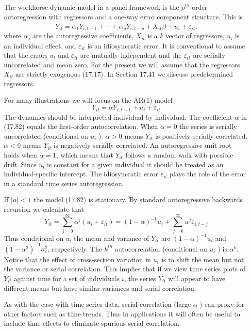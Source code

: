 \documentclass[10pt]{article}
\begin{document}
The workhorse dynamic model in a panel framework is the $p^{t h}$-order autoregression with regressors and a one-way error component structure. This is
$$
Y_{i t}=\alpha_{1} Y_{i, t-1}+\cdots+\alpha_{p} Y_{i, t-p}+X_{i t}^{\prime} \beta+u_{i}+\varepsilon_{i t} .
$$
where $\alpha_{j}$ are the autoregressive coefficients, $X_{i t}$ is a $k$ vector of regressors, $u_{i}$ is an individual effect, and $\varepsilon_{i t}$ is an idiosyncratic error. It is conventional to assume that the errors $u_{i}$ and $\varepsilon_{i t}$ are mutually independent and the $\varepsilon_{i t}$ are serially uncorrelated and mean zero. For the present we will assume that the regressors $X_{i t}$ are strictly exogenous (17.17). In Section $17.41$ we discuss predetermined regressors.

For many illustrations we will focus on the AR(1) model
$$
Y_{i t}=\alpha Y_{i, t-1}+u_{i}+\varepsilon_{i t}
$$
The dynamics should be interpreted individual-by-individual. The coefficient $\alpha$ in (17.82) equals the first-order autocorrelation. When $\alpha=0$ the series is serially uncorrelated (conditional on $u_{i}$ ). $\alpha>0$ means $Y_{i t}$ is positively serially correlated. $\alpha<0$ means $Y_{i t}$ is negatively serially correlated. An autoregressive unit root holds when $\alpha=1$, which means that $Y_{i t}$ follows a random walk with possible drift. Since $u_{i}$ is constant for a given individual it should be treated as an individual-specific intercept. The idiosyncratic error $\varepsilon_{i t}$ plays the role of the error in a standard time series autoregression.

If $|\alpha|<1$ the model (17.82) is stationary. By standard autoregressive backwards recursion we calculate that
$$
Y_{i t}=\sum_{j=0}^{\infty} \alpha^{j}\left(u_{i}+\varepsilon_{i t}\right)=(1-\alpha)^{-1} u_{i}+\sum_{j=0}^{\infty} \alpha^{j} \varepsilon_{i, t-j}
$$
Thus conditional on $u_{i}$ the mean and variance of $Y_{i t}$ are $(1-\alpha)^{-1} u_{i}$ and $\left(1-\alpha^{2}\right)^{-1} \sigma_{\varepsilon}^{2}$, respectively. The $k^{t h}$ autocorrelation (conditional on $u_{i}$ ) is $\alpha^{k}$. Notice that the effect of cross-section variation in $u_{i}$ is to shift the mean but not the variance or serial correlation. This implies that if we view time series plots of $Y_{i t}$ against time for a set of individuals $i$, the series $Y_{i t}$ will appear to have different means but have similar variances and serial correlation.

As with the case with time series data, serial correlation (large $\alpha$ ) can proxy for other factors such as time trends. Thus in applications it will often be useful to include time effects to eliminate spurious serial correlation.
\end{document}
